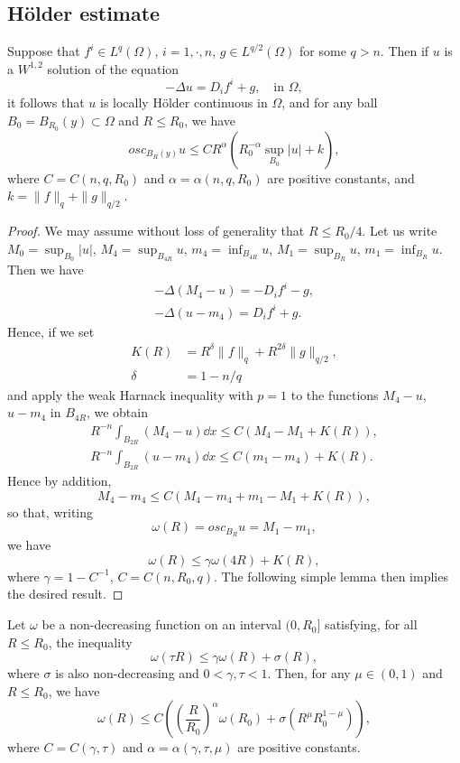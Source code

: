 \subsection{H\"older estimate}

\begin{theorem}
	Suppose that $f^i\in L^q(\Omega)$, $i=1, \cdot, n$, $g\in L^{q/2}(\Omega)$ for some $q>n$.
	Then if $u$ is a $W^{1,2}$ solution of the equation
	\[
		-\Delta u = D_if^i + g,\quad\text{in }\Omega,
	\]
	it follows that $u$ is locally H\"older continuous in $\Omega$, 
	and for any ball $B_0=B_{R_0}(y)\subset\Omega$ and $R\leq R_0$, we have
	\[
		osc_{B_R(y)}u\leq CR^{\alpha}(R_0^{-\alpha}\sup_{B_0}|u| + k),
	\]
	where $C=C(n,q,R_0)$ and $\alpha=\alpha(n,q,R_0)$ are positive constants, 
	and $k=\|f\|_q + \|g\|_{q/2}$. 
\end{theorem}

\begin{proof}
	We may assume without loss of generality that $R\leq R_0/4$.
	Let us write $M_0=\sup_{B_0}|u|$, $M_4 = \sup_{B_{4R}}u$, $m_4 = \inf_{B_{4R}}u$,
	$M_1=\sup_{B_R}u$, $m_1 = \inf_{B_R}u$.
	Then we have 
	\begin{gather*}
		-\Delta(M_4-u) = -D_if^i - g,\\
		-\Delta(u-m_4) = D_if^i + g.
	\end{gather*}
	Hence, if we set
	\begin{align*}
		K(R) &= R^\delta\|f\|_q + R^{2\delta}\|g\|_{q/2},\\
		\delta &= 1-n/q 
	\end{align*}
	and apply the weak Harnack inequality with $p=1$ to the functions 
	$M_4-u$, $u-m_4$ in $B_{4R}$, we obtain
	\begin{gather*}
		R^{-n}\int_{B_{2R}}(M_4-u)\dd x \leq C(M_4 - M_1 + K(R)),\\
		R^{-n}\int_{B_{2R}}(u-m_4)\dd x \leq C(m_1-m_4) + K(R).
	\end{gather*}
	Hence by addition,
	\[
		M_4 - m_4 \leq C(M_4 - m_4 + m_1 - M_1 + K(R)),
	\]
	so that, writing 
	\[
		\omega(R) = osc_{B_R} u = M_1 - m_1,
	\]
	we have 
	\[
		\omega(R) \leq \gamma\omega(4R) + K(R),
	\]
	where $\gamma = 1- C^{-1}$, $C = C(n,R_0,q)$.
	The following simple lemma then implies the desired result.
\end{proof}

\begin{lemma}
	Let $\omega$ be a non-decreasing function on an interval $(0,R_0]$ satisfying,
	for all $R\leq R_0$, the inequality 
	\[
		\omega(\tau R) \leq \gamma \omega(R) + \sigma(R),
	\]
	where $\sigma$ is also non-decreasing and $0<\gamma, \tau < 1$.
	Then, for any $\mu\in(0,1)$ and $R\leq R_0$,
	we have 
	\[
		\omega(R)\leq C\left(\left(\frac{R}{R_0}\right)^\alpha \omega(R_0) + \sigma(R^\mu R_0^{1-\mu})\right),
	\]
	where $C=C(\gamma, \tau)$ and $\alpha=\alpha(\gamma, \tau, \mu)$ are positive constants.
\end{lemma}

